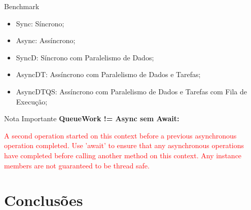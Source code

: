 \documentclass[10pt]{beamer}
\begin{document}
\begin{frame}{Benchmark}
	\begin{figure}
	\end{figure}
	\vspace{-0.5cm}
	\scriptsize
	\begin{itemize}
		\item Sync: Síncrono;
		\item Async: Assíncrono;
		\item SyncD: Síncrono com Paralelismo de Dados;
		\item AsyncDT: Assíncrono com Paralelismo de Dados e Tarefas;
		\item AsyncDTQS: Assíncrono com Paralelismo de Dados e Tarefas com Fila de Execução;
	\end{itemize}
\end{frame}

\begin{frame}{Nota Importante}
	\textbf{QueueWork != Async sem Await:} 
	\vspace{0.3cm}
	
	\textcolor{red}{A second operation started on this context before a previous asynchronous operation completed. Use 'await' to ensure that any asynchronous operations have completed before calling another method on this context. Any instance members are not guaranteed to be thread safe.}
\end{frame}

\section{Conclusões}
\end{document}
